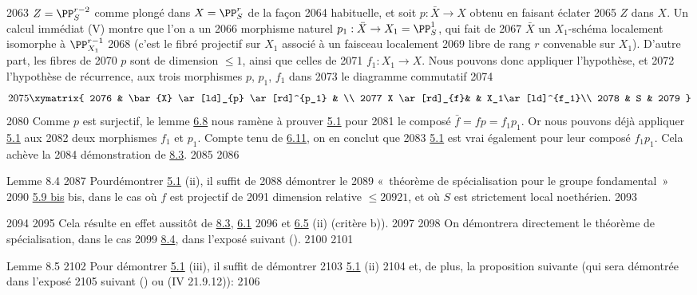   2063	$Z=\PP^{r-2}_S$ comme plongé dans $X=\PP^r_S$ de la façon
  2064	habituelle, et soit $p:\bar{X}\rightarrow X$ obtenu en faisant éclater
  2065	$Z$ dans $X$. Un calcul immédiat (\cf \EGA V) montre que l'on a un
  2066	morphisme naturel $p_1:\bar{X}\rightarrow X_1=\PP^1_S$, qui fait de
  2067	$\bar{X}$ un $X_1$-schéma localement isomorphe à $\PP^{r-1}_{X_1}$
  2068	(c'est le fibré projectif sur $X_1$ associé à un faisceau localement
  2069	libre de rang $r$ convenable sur $X_1$). D'autre part, les fibres de
  2070	$p$ sont de dimension $\leq 1$, ainsi que celles de
  2071	$f_1:X_1\rightarrow X$. Nous pouvons donc appliquer l'hypothèse, et
  2072	l'hypothèse de récurrence, aux trois morphismes $p$, $p_1$, $f_1$ dans
  2073	le diagramme commutatif
  2074	$$
  2075	\xymatrix{
  2076	   & \bar{X} \ar[ld]_{p} \ar[rd]^{p_1} &          \\
  2077	 X \ar[rd]_{f}&           & X_1\ar[ld]^{f_1}\\
  2078	   &    S      &       
  2079	}$$
  2080	Comme $p$ est surjectif, le lemme \hyperref[XII.prop6.8]{6.8} nous ramène à prouver \hyperref[XII.thm5.1]{5.1} pour
  2081	le composé $\bar{f}=fp=f_1p_1$. Or nous pouvons déjà appliquer \hyperref[XII.thm5.1]{5.1} aux
  2082	deux morphismes $f_1$ et $p_1$. Compte tenu de \hyperref[XII.prop6.11]{6.11}, on en conclut que
  2083	\hyperref[XII.thm5.1]{5.1} est vrai également pour leur composé $f_1p_1$. Cela achève la
  2084	démonstration de \hyperref[XII.lem8.3]{8.3}.
  2085	
  2086	\begin{enonce*}{Lemme 8.4}
  2087	Pour\pageoriginale démontrer {\rm \hyperref[XII.thm5.1]{5.1} (ii)}, il suffit de
  2088	démontrer le 
  2089	« théorème de spécialisation pour le groupe fondamental » {\rm
  2090	\hyperref[XII.thmbis5.9]{5.9 bis} bis}, dans le cas où $f$ est projectif de
  2091	dimension relative $\leq 
  2092	  1$, et où $S$ est strictement local noethérien.
  2093	\end{enonce*}
  2094	
  2095	Cela résulte en effet aussitôt de \hyperref[XII.lem8.3]{8.3}, \hyperref[XII.lem6.1]{6.1}
  2096	et \hyperref[XII.prop6.5]{6.5} (ii) (critère b)). 
  2097	
  2098	On démontrera directement le théorème de spécialisation, dans le cas
  2099	\hyperref[XII.lem8.4]{8.4}, dans l'exposé suivant ().
  2100	
  2101	\begin{enonce*}{Lemme 8.5}
  2102	Pour démontrer {\rm \hyperref[XII.thm5.1]{5.1} (iii)}, il suffit de démontrer
  2103	{\rm \hyperref[XII.thm5.1]{5.1} (ii)} 
  2104	et, de plus, la proposition suivante (qui sera démontrée dans l'exposé
  2105	suivant {\rm ()} ou {\rm(\EGA IV 21.9.12)}):
  2106	\end{enonce*}
